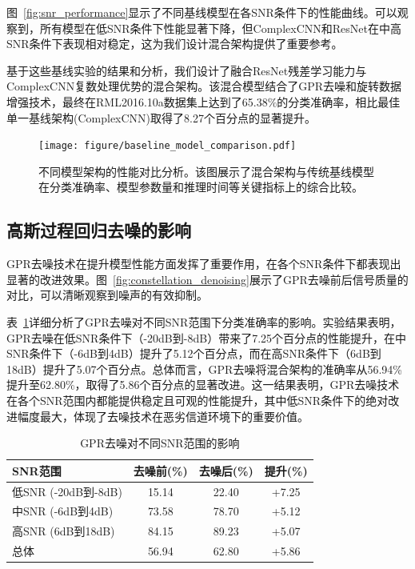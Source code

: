 \documentclass[conference]{IEEEtran}
\begin{document}
图~\ref{fig:snr_performance}显示了不同基线模型在各SNR条件下的性能曲线。可以观察到，所有模型在低SNR条件下性能显著下降，但ComplexCNN和ResNet在中高SNR条件下表现相对稳定，这为我们设计混合架构提供了重要参考。

基于这些基线实验的结果和分析，我们设计了融合ResNet残差学习能力与ComplexCNN复数处理优势的混合架构。该混合模型结合了GPR去噪和旋转数据增强技术，最终在RML2016.10a数据集上达到了65.38\%的分类准确率，相比最佳单一基线架构(ComplexCNN)取得了8.27个百分点的显著提升。

\begin{figure}[htbp]
\centering
\texttt{[image: figure/baseline\_model\_comparison.pdf]}
\caption{不同模型架构的性能对比分析。该图展示了混合架构与传统基线模型在分类准确率、模型参数量和推理时间等关键指标上的综合比较。}
\label{fig:model_comparison}
\end{figure}

\subsection{高斯过程回归去噪的影响}
GPR去噪技术在提升模型性能方面发挥了重要作用，在各个SNR条件下都表现出显著的改进效果。图~\ref{fig:constellation_denoising}展示了GPR去噪前后信号质量的对比，可以清晰观察到噪声的有效抑制。

表~\ref{tab:gpr_impact}详细分析了GPR去噪对不同SNR范围下分类准确率的影响。实验结果表明，GPR去噪在低SNR条件下（-20dB到-8dB）带来了7.25个百分点的性能提升，在中SNR条件下（-6dB到4dB）提升了5.12个百分点，而在高SNR条件下（6dB到18dB）提升了5.07个百分点。总体而言，GPR去噪将混合架构的准确率从56.94\%提升至62.80\%，取得了5.86个百分点的显著改进。这一结果表明，GPR去噪技术在各个SNR范围内都能提供稳定且可观的性能提升，其中低SNR条件下的绝对改进幅度最大，体现了去噪技术在恶劣信道环境下的重要价值。

\begin{table}[h]
\centering
\caption{GPR去噪对不同SNR范围的影响}
\label{tab:gpr_impact}
\begin{tabular}{@{}lccc@{}}
\toprule
SNR范围 & 去噪前(\%) & 去噪后(\%) & 提升(\%) \\
\midrule
低SNR (-20dB到-8dB) & 15.14 & 22.40 & +7.25 \\
中SNR (-6dB到4dB) & 73.58 & 78.70 & +5.12 \\
高SNR (6dB到18dB) & 84.15 & 89.23 & +5.07 \\
总体 & 56.94 & 62.80 & +5.86 \\
\bottomrule
\end{tabular}
\end{table}
\end{document}
